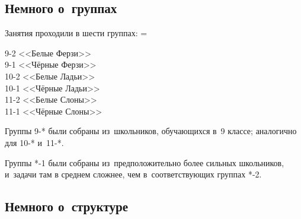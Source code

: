


\begingroup
\providecommand{\ifsourcelinks}{\iffalse}

\strut

\vfill

\begin{center}
\end{center}

\vfill

\strut

\clearpage


\subsection*{Немного о~группах}

Занятия проходили в шести группах:
\begingroup\multicolsep=\parskip
\begin{multicols}{3}
9-2  <<Белые Ферзи>>
\\
9-1  <<Чёрные Ферзи>>
\\
10-2 <<Белые Ладьи>>
\\
10-1 <<Чёрные Ладьи>>
\\
11-2 <<Белые Слоны>>
\\
11-1 <<Чёрные Слоны>>
\end{multicols}
\endgroup

Группы \mbox{9-*} были собраны из~школьников, обучающихся в~9 классе;
аналогично для \mbox{10-*} и~\mbox{11-*}.

Группы \mbox{*-1} были собраны из~предположительно более сильных школьников,
и~задачи там в среднем сложнее, чем в~соответствующих группах \mbox{*-2}.


\subsection*{Немного о~структуре}

